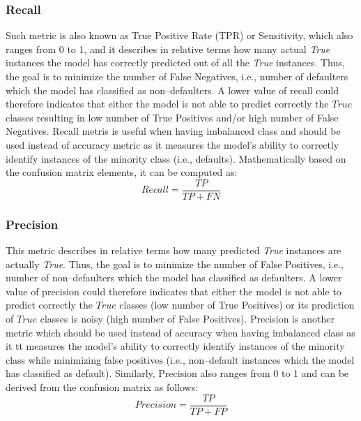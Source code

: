 \subsubsection{Recall}
Such metric is also known as True Positive Rate (TPR) or Sensitivity, which also ranges from 0 to 1, and it describes in relative terms how many actual \textit{True} instances the model has correctly predicted out of all the \textit{True} instances. Thus, the goal is to minimize the number of False Negatives, i.e., number of defaulters which the model has classified as non--defaulters.
A lower value of recall could therefore indicates that either the model is not able to predict correctly the $True$ classes resulting in low number of True Positives and/or high number of False Negatives.
Recall metris is useful when having imbalanced class and should be used instead of accuracy metric as it measures the model's ability to correctly identify instances of the minority class (i.e., defaults).
Mathematically based on the confusion matrix elements, it can be computed as:
\begin{equation}\label{eq}
    Recall = \frac{TP}{TP + FN}
\end{equation}

\subsubsection{Precision}
This metric describes in relative terms how many predicted \textit{True} instances are actually \textit{True}. Thus, the goal is to minimize the number of False Positives, i.e., number of non--defaulters which the model has classified as defaulters.
A lower value of precision could therefore indicates that either the model is not able to predict correctly the $True$ classes (low number of True Positives) or its prediction of $True$ classes is noisy (high number of False Positives).
Precision is another metric which should be used instead of accuracy when having imbalanced class as it tt measures the model's ability to correctly identify instances of the minority class while minimizing false positives (i.e., non--default instances which the model has classified as default).
Similarly, Precision also ranges from 0 to 1 and can be derived from the confusion matrix as follows:
\begin{equation}\label{eq}
    Precision = \frac{TP}{TP + FP}
\end{equation}
